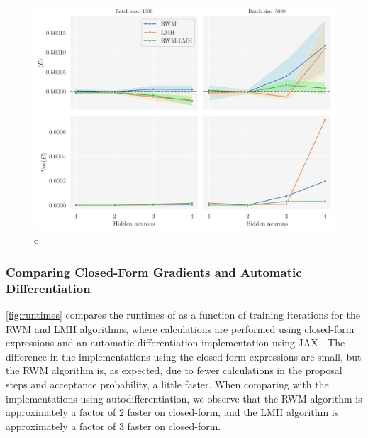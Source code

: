 \begin{figure}[!htb]
\begin{center}\includegraphics[width=\textwidth]{latex/figures/hidden_neurons_batch_size_extra.pdf}
\end{center}
\caption{c}
\label{fig:hidden_neurons_batch_size_extra}
\end{figure}

\FloatBarrier

\subsubsection*{Comparing Closed-Form Gradients and Automatic Differentiation}

\autoref{fig:runtimes} compares the runtimes of as a function of training iterations for the RWM and LMH algorithms, where calculations are performed using closed-form expressions and an automatic differentiation implementation using JAX \citep{jax2018github}. The difference in the implementations using the closed-form expressions are small, but the RWM algorithm is, as expected, due to fewer calculations in the proposal steps and acceptance probability, a little faster. When comparing with the implementations using autodifferentiation, we observe that the RWM algorithm is approximately a factor of $2$ faster on closed-form, and the LMH algorithm is approximately a factor of $3$ faster on closed-form. 

